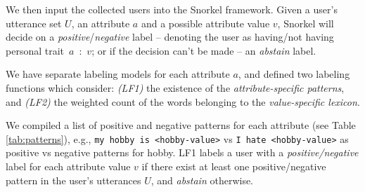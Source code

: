 We then input the collected users into the Snorkel framework. Given a user's utterance set $U$, an attribute $a$ and a possible attribute value $v$, Snorkel will decide on a \emph{positive}/\emph{negative} label -- denoting the user as having/not having personal trait~$a$~:~$v$; or if the decision can't be made -- an \emph{abstain} label.%

We have separate labeling models for each attribute $a$, and defined two labeling functions which consider: \emph{(LF1)} the existence of the \emph{attribute-specific patterns}, and \emph{(LF2)} the weighted count of the words belonging to the \emph{value-specific lexicon}.

 We compiled a list of positive and negative patterns for each attribute (see Table \ref{tab:patterns}), e.g., \texttt{my hobby is <hobby-value>} vs \texttt{I hate <hobby-value>} as positive vs negative patterns for hobby.
LF1 labels a user with a \emph{positive/negative} label for each attribute value $v$ if there exist at least one positive/negative pattern in the user's utterances $U$, and \emph{abstain} otherwise.

